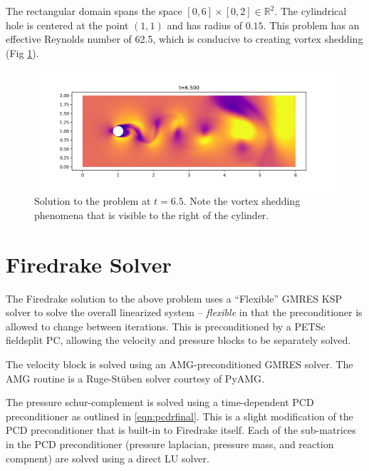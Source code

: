 \documentclass{article}
\begin{document}
The rectangular domain spans the space $\left[0,6\right]\times\left[0,2\right]\in\mathbb{R}^2$.  The cylindrical hole is centered at the point $\left(1,1\right)$ and has radius of $0.15$.  This problem has an effective Reynolds number of 62.5, which is conducive to creating vortex shedding (Fig \ref{fig:vortex}).
\begin{figure}[h]
  \includegraphics[width=\textwidth]{figures/vortex.png}
  \caption{Solution to the problem at $t=6.5$.  Note the vortex shedding phenomena that is visible to the right of the cylinder.}
  \label{fig:vortex}
\end{figure}

\section{Firedrake Solver}
The Firedrake\cite{Firedrake} solution to the above problem uses a ``Flexible'' GMRES KSP solver to solve the overall linearized system -- \textit{flexible} in that the preconditioner is allowed to change between iterations.  This is preconditioned by a PETSc fieldsplit PC, allowing the velocity and pressure blocks to be separately solved.

The velocity block is solved using an AMG-preconditioned GMRES solver.  The AMG routine is a Ruge-St\"uben solver courtesy of PyAMG\cite{OlSc2018}.

The pressure schur-complement is solved using a time-dependent PCD preconditioner as outlined in \eqref{eqn:pcdrfinal}.  This is a slight modification of the PCD preconditioner that is built-in to Firedrake itself.  Each of the sub-matrices in the PCD preconditioner (pressure laplacian, pressure mass, and reaction compnent) are solved using a direct LU solver.

\nocite{*}


\end{document}
